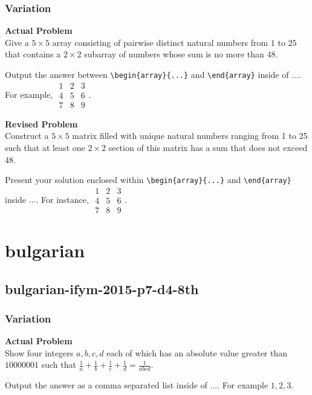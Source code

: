 \subsubsection{Variation}
\textbf{Actual Problem}\\
Give a $5\times 5$ array consisting of pairwise distinct natural numbers from $1$ to $25$ that contains a $2\times 2$ subarray of numbers whose sum is no more than $48$.

Output the answer between \verb|\begin{array}{...}| and \verb|\end{array}| inside of $\boxed{...}$. For example, $\boxed{\begin{array}{ccc}1 & 2 & 3 \\ 4 & 5 & 6 \\ 7 & 8 & 9\end{array}}$.

\textbf{Revised Problem}\\
Construct a $5\times 5$ matrix filled with unique natural numbers ranging from 1 to 25 such that at least one $2\times 2$ section of this matrix has a sum that does not exceed 48.

Present your solution enclosed within \verb|\begin{array}{...}| and \verb|\end{array}| inside $\boxed{...}$. For instance, $\boxed{\begin{array}{ccc}1 & 2 & 3 \\ 4 & 5 & 6 \\ 7 & 8 & 9\end{array}}$.

\section{bulgarian}
\subsection{bulgarian-ifym-2015-p7-d4-8th}
\subsubsection{Variation}
\textbf{Actual Problem}\\
Show four integers $a, b, c, d$ each of which has an absolute value greater than $10000001$ such that $\frac{1}{a} + \frac{1}{b} + \frac{1}{c} + \frac{1}{d} = \frac{1}{abcd}$.

Output the answer as a comma separated list inside of $\boxed{...}$. For example $\boxed{1, 2, 3}$.

